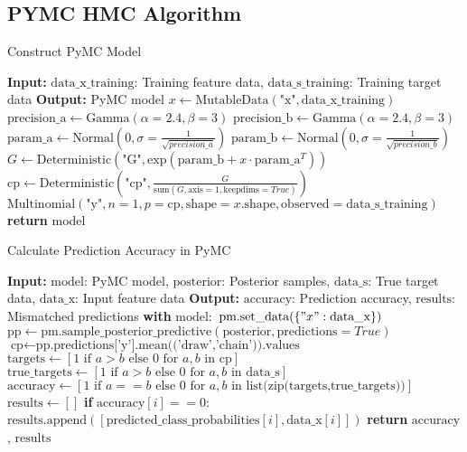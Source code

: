 \subsection{PYMC HMC Algorithm}

\begin{algorithm}[H]
	\label{algo:construct_model}
	\caption{Construct PyMC Model}
	\begin{algorithmic}[1]
		\State \textbf{Input:} $\text{data\_x\_training}$: Training feature data, $\text{data\_s\_training}$: Training target data
		\State \textbf{Output:} PyMC model
		\State $x \gets \text{MutableData}(\text{"x"}, \text{data\_x\_training})$
		\State $\text{precision\_a} \gets \text{Gamma}(\alpha=2.4, \beta=3)$
		\State $\text{precision\_b} \gets \text{Gamma}(\alpha=2.4, \beta=3)$
		\State $\text{param\_a} \gets \text{Normal}(0, \sigma=\frac{1}{\sqrt{precision\_a}})$
		\State $\text{param\_b} \gets \text{Normal}(0, \sigma=\frac{1}{\sqrt{precision\_b}})$
		\State $G \gets \text{Deterministic}(\text{"G"}, \text{exp}(\text{param\_b} + x \cdot \text{param\_a}^T))$ 
		\State $\text{cp} \gets \text{Deterministic}(\text{"cp"}, \frac{G}{\text{sum}(G, \text{axis}=1, \text{keepdims}=True)})$
		\State $\text{Multinomial}(\text{"y"}, n=1, p=\text{cp}, \text{shape}=x.\text{shape}, \text{observed}=\text{data\_s\_training})$
		\State \textbf{return} model
	\end{algorithmic}
\end{algorithm}

\begin{algorithm}[H]
	\label{algo:prediction_accuracy}
	\caption{Calculate Prediction Accuracy in PyMC}
	\begin{algorithmic}[1]
		\State \textbf{Input:} $\text{model}$: PyMC model, $\text{posterior}$: Posterior samples, $\text{data\_s}$: True target data, $\text{data\_x}$: Input feature data
		\State \textbf{Output:} $\text{accuracy}$: Prediction accuracy, $\text{results}$: Mismatched predictions
		\State \textbf{with} $\text{model}:$
		\State \quad $\text{pm.set\_data}(\{"x": \text{data\_x}\})$
		\State \quad $\text{pp} \gets \text{pm.sample\_posterior\_predictive}(\text{posterior}, \text{predictions}=True)$ 
		\State  $\text{cp} \gets \text{pp.predictions['y'].mean(('draw','chain')).values}$
		\State  $\text{targets} \gets [1 \text{ if } a>b \text{ else } 0 \text{ for } a,b \text{ in } \text{cp}]$
		\State  $\text{true\_targets} \gets [1 \text{ if } a>b \text{ else } 0 \text{ for } a,b \text{ in } \text{data\_s}]$
		\State  $\text{accuracy} \gets [1 \text{ if } a == b \text{ else } 0 \text{ for } a,b \text{ in } \text{list(zip(targets,true\_targets))}]$
		\State $\text{results} \gets []$
		\State \quad \textbf{if} $\text{accuracy}[i] == 0:$
		\State \quad \quad $\text{results.append}([\text{predicted\_class\_probabilities}[i],\text{data\_x}[i]])$
		\EndFor
		\State \textbf{return} $\text{accuracy}$, $\text{results}$
	\end{algorithmic}
\end{algorithm}




